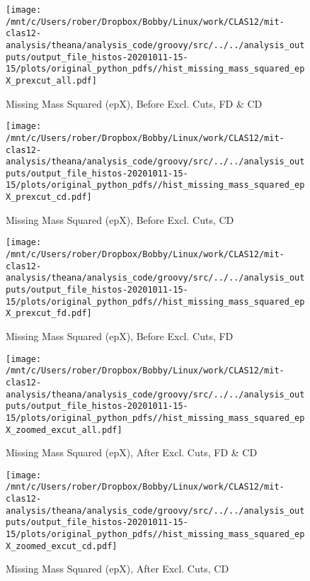 \documentclass{article}
\begin{document}
\begin{landscape}
\begin{figure}[h]
        \texttt{[image: /mnt/c/Users/rober/Dropbox/Bobby/Linux/work/CLAS12/mit-clas12-analysis/theana/analysis\_code/groovy/src/../../analysis\_outputs/output\_file\_histos-20201011-15-15/plots/original\_python\_pdfs//hist\_missing\_mass\_squared\_epX\_prexcut\_all.pdf]}
        \captionsetup{textformat=empty,labelformat=blank}
        \caption{Missing Mass Squared (epX), Before Excl. Cuts, FD \& CD}
    \end{figure}
    \clearpage
    
    \begin{figure}[h]
        \centering

        \texttt{[image: /mnt/c/Users/rober/Dropbox/Bobby/Linux/work/CLAS12/mit-clas12-analysis/theana/analysis\_code/groovy/src/../../analysis\_outputs/output\_file\_histos-20201011-15-15/plots/original\_python\_pdfs//hist\_missing\_mass\_squared\_epX\_prexcut\_cd.pdf]}
        \captionsetup{textformat=empty,labelformat=blank}
        \caption{Missing Mass Squared (epX), Before Excl. Cuts, CD}
    \end{figure}
    \clearpage
    
    \begin{figure}[h]
        \centering

        \texttt{[image: /mnt/c/Users/rober/Dropbox/Bobby/Linux/work/CLAS12/mit-clas12-analysis/theana/analysis\_code/groovy/src/../../analysis\_outputs/output\_file\_histos-20201011-15-15/plots/original\_python\_pdfs//hist\_missing\_mass\_squared\_epX\_prexcut\_fd.pdf]}
        \captionsetup{textformat=empty,labelformat=blank}
        \caption{Missing Mass Squared (epX), Before Excl. Cuts, FD}
    \end{figure}
    \clearpage
    
    \begin{figure}[h]
        \centering

        \texttt{[image: /mnt/c/Users/rober/Dropbox/Bobby/Linux/work/CLAS12/mit-clas12-analysis/theana/analysis\_code/groovy/src/../../analysis\_outputs/output\_file\_histos-20201011-15-15/plots/original\_python\_pdfs//hist\_missing\_mass\_squared\_epX\_zoomed\_excut\_all.pdf]}
        \captionsetup{textformat=empty,labelformat=blank}
        \caption{Missing Mass Squared (epX), After Excl. Cuts, FD \& CD}
    \end{figure}
    \clearpage
    
    \begin{figure}[h]
        \centering

        \texttt{[image: /mnt/c/Users/rober/Dropbox/Bobby/Linux/work/CLAS12/mit-clas12-analysis/theana/analysis\_code/groovy/src/../../analysis\_outputs/output\_file\_histos-20201011-15-15/plots/original\_python\_pdfs//hist\_missing\_mass\_squared\_epX\_zoomed\_excut\_cd.pdf]}
        \captionsetup{textformat=empty,labelformat=blank}
        \caption{Missing Mass Squared (epX), After Excl. Cuts, CD}
    \end{figure}
    \clearpage
    

\end{landscape}
\end{document}
